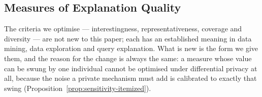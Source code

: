 \subsection{Measures of Explanation Quality}
\label{sec:explanation-quality}

The criteria we optimise --- interestingness, representativeness, coverage and diversity --- are not new to this paper; each has an established meaning in data mining, data exploration and query explanation.
What is new is the form we give them, and the reason for the change is always the same: a measure whose value can be swung by one individual cannot be optimised under differential privacy at all, because the noise a private mechanism must add is calibrated to exactly that swing (Proposition~\ref{prop:sensitivity-itemized}).

